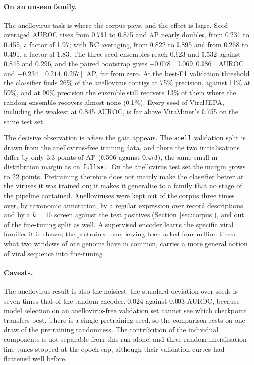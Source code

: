 \documentclass[10pt,twocolumn,a4paper]{article}
\begin{document}
\paragraph{On an unseen family.}
The anellovirus task is where the corpus pays, and the effect is large.
Seed-averaged AUROC rises from 0.791 to 0.875 and AP nearly doubles, from 0.231
to 0.455, a factor of 1.97; with RC averaging, from 0.822 to 0.895 and from 0.268
to 0.491, a factor of 1.83. The three-seed ensembles reach 0.923 and 0.532 against 0.845 and 0.296, and the
paired bootstrap gives $+0.078$ $[0.069, 0.086]$ AUROC and $+0.234$
$[0.214, 0.257]$ AP, far from zero. At the best-F1 validation threshold the
classifier finds 26\% of the anellovirus contigs at 75\% precision, against 11\%
at 59\%, and at 90\% precision the ensemble still recovers 13\% of them where the
random ensemble recovers almost none (0.1\%). Every seed of ViralJEPA, including the weakest at
0.845 AUROC, is far above ViraMiner's 0.755 on the same test set.

The decisive observation is \emph{where} the gain appears. The \texttt{anell}
validation split is drawn from the anellovirus-free training data, and there the
two initialisations differ by only 3.3 points of AP (0.506 against 0.473), the
same small in-distribution margin as on \texttt{fullset}. On the anellovirus test
set the margin grows to 22 points. Pretraining therefore does not mainly make the
classifier better at the viruses it was trained on; it makes it generalise to a
family that no stage of the pipeline contained. Anelloviruses were kept out of
the corpus three times over, by taxonomic annotation, by a regular expression
over record descriptions and by a $k=15$ screen against the test positives
(Section~\ref{sec:corpus}), and out of the fine-tuning split as well. A
supervised encoder learns the specific viral families it is shown; the pretrained
one, having been asked four million times what two windows of one genome have in
common, carries a more general notion of viral sequence into fine-tuning.

\paragraph{Caveats.}
The anellovirus result is also the noisiest: the standard deviation over seeds is
seven times that of the random encoder, 0.024 against 0.003 AUROC, because model
selection on an anellovirus-free validation set cannot see which checkpoint
transfers best. There is a single pretraining seed, so the comparison rests on
one draw of the pretraining randomness. The contribution of the individual
components is not separable from this run alone, and three random-initialisation
fine-tunes stopped at the epoch cap, although their validation curves had
flattened well before.
\end{document}
